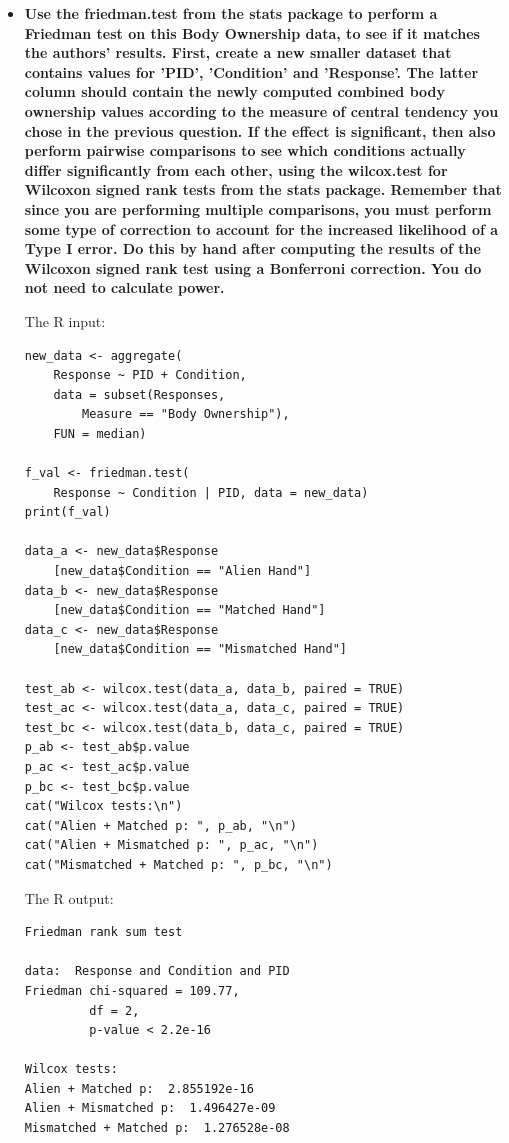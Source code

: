 \begin{itemize}
\item {
    \textbf{
        Use the friedman.test from the stats package to perform a
        Friedman test on this Body Ownership data, to see if it matches
        the authors' results. First, create a new smaller dataset that contains values for 'PID', 'Condition' and 'Response'. The latter column should contain the newly computed combined body ownership values according to the measure of central tendency you
        chose in the previous question. If the effect is significant, then also
        perform pairwise comparisons to see which conditions actually
        differ significantly from each other, using the wilcox.test for
        Wilcoxon signed rank tests from the stats package. Remember
        that since you are performing multiple comparisons, you must
        perform some type of correction to account for the increased likelihood of a Type I error. Do this by hand after computing the results
        of the Wilcoxon signed rank test using a Bonferroni correction.
        You do not need to calculate power.
    }

The R input:
\begin{verbatim}
new_data <- aggregate(
    Response ~ PID + Condition,
    data = subset(Responses,
        Measure == "Body Ownership"),
    FUN = median)

f_val <- friedman.test(
    Response ~ Condition | PID, data = new_data)
print(f_val)

data_a <- new_data$Response
    [new_data$Condition == "Alien Hand"]
data_b <- new_data$Response
    [new_data$Condition == "Matched Hand"]
data_c <- new_data$Response
    [new_data$Condition == "Mismatched Hand"]

test_ab <- wilcox.test(data_a, data_b, paired = TRUE)
test_ac <- wilcox.test(data_a, data_c, paired = TRUE)
test_bc <- wilcox.test(data_b, data_c, paired = TRUE)
p_ab <- test_ab$p.value
p_ac <- test_ac$p.value
p_bc <- test_bc$p.value
cat("Wilcox tests:\n")
cat("Alien + Matched p: ", p_ab, "\n")
cat("Alien + Mismatched p: ", p_ac, "\n")
cat("Mismatched + Matched p: ", p_bc, "\n")

\end{verbatim}
The R output:

\begin{verbatim}
Friedman rank sum test

data:  Response and Condition and PID
Friedman chi-squared = 109.77,
         df = 2,
         p-value < 2.2e-16

Wilcox tests:
Alien + Matched p:  2.855192e-16 
Alien + Mismatched p:  1.496427e-09 
Mismatched + Matched p:  1.276528e-08
\end{verbatim}

}
\end{itemize}
